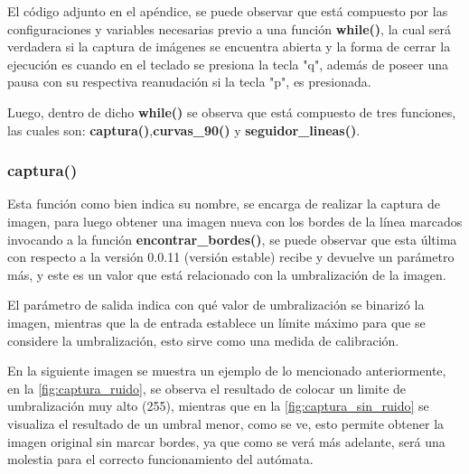\documentclass[11pt,a4paper]{article}
\begin{document}
	El código adjunto en el apéndice, se puede observar que está compuesto por las configuraciones y variables necesarias previo a una función \textbf{while()}, la cual será verdadera si la captura de imágenes se encuentra abierta y la forma de cerrar la ejecución es cuando en el teclado se presiona la tecla "q", además de poseer una pausa con su respectiva reanudación si la tecla "p", es presionada. 
	
	Luego, dentro de dicho \textbf{while()} se observa que está compuesto de tres funciones, las cuales son: \textbf{captura()},\textbf{curvas\_90()} y \textbf{seguidor\_lineas()}.
	
	\subsubsection{captura()}
	Esta función como bien indica su nombre, se encarga de realizar la captura de imagen, para luego obtener una imagen nueva con los bordes de la línea marcados invocando a la función \textbf{encontrar\_bordes()}, se puede observar que esta última con respecto a la versión 0.0.11 (versión estable) recibe y devuelve un parámetro más, y este es un valor que está relacionado con la umbralización de la imagen. 
	
	El parámetro de salida indica con qué valor de umbralización se binarizó la imagen, mientras que la de entrada establece un límite máximo para que se considere la umbralización, esto sirve como una medida de calibración.  
	
	En la siguiente imagen se muestra un ejemplo de lo mencionado anteriormente, en la \autoref*{fig:captura_ruido}, se observa el resultado de colocar un limite de umbralización muy alto (255), mientras que en la \autoref*{fig:captura_sin_ruido} se visualiza el resultado de un umbral menor, como se ve, esto permite obtener la imagen original sin marcar bordes, ya que como se verá más adelante, será una molestia para el correcto funcionamiento del autómata.
	
\end{document}
